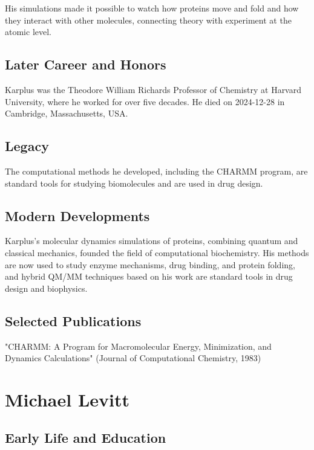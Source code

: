 His simulations made it possible to watch how proteins move and fold and how they interact with other molecules, connecting theory with experiment at the atomic level.

\subsection*{Later Career and Honors}

Karplus was the Theodore William Richards Professor of Chemistry at Harvard University, where he worked for over five decades. He died on 2024-12-28 in Cambridge, Massachusetts, USA.

\subsection*{Legacy}

The computational methods he developed, including the CHARMM program, are standard tools for studying biomolecules and are used in drug design.

\subsection*{Modern Developments}

Karplus's molecular dynamics simulations of proteins, combining quantum and classical mechanics, founded the field of computational biochemistry. His methods are now used to study enzyme mechanisms, drug binding, and protein folding, and hybrid QM/MM techniques based on his work are standard tools in drug design and biophysics.

\subsection*{Selected Publications}

"CHARMM: A Program for Macromolecular Energy, Minimization, and Dynamics Calculations" (Journal of Computational Chemistry, 1983)

\clearpage

\section{Michael Levitt}

\subsection*{Early Life and Education}

